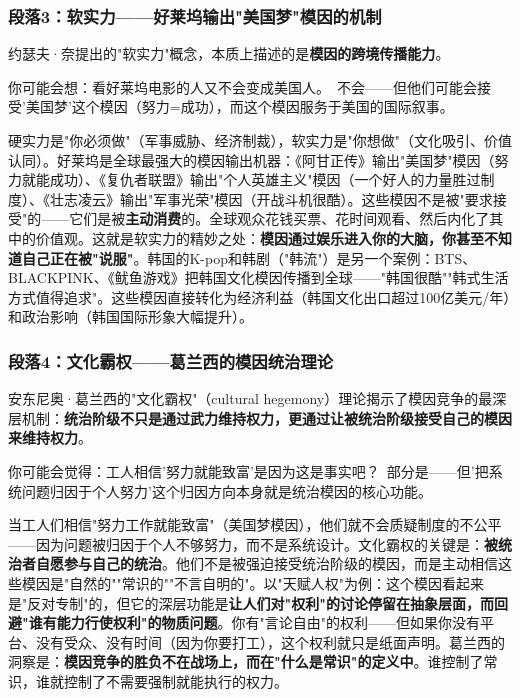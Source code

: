\documentclass[../main.tex]{subfiles}
\begin{document}
	\subsubsection*{段落3：软实力——好莱坞输出"美国梦"模因的机制}

	约瑟夫·奈提出的"软实力"概念，本质上描述的是\textbf{模因的跨境传播能力}。

	\begin{tcolorbox}[colback=yellow!5, title=\textit{读者行为预测}]

		你可能会想：看好莱坞电影的人又不会变成美国人。\ 不会——但他们可能会接受'美国梦'这个模因（努力=成功），而这个模因服务于美国的国际叙事。

	\end{tcolorbox}

硬实力是"你必须做"（军事威胁、经济制裁），软实力是"你想做"（文化吸引、价值认同）。好莱坞是全球最强大的模因输出机器：《阿甘正传》输出"美国梦"模因（努力就能成功）、《复仇者联盟》输出"个人英雄主义"模因（一个好人的力量胜过制度）、《壮志凌云》输出"军事光荣"模因（开战斗机很酷）。这些模因不是被"要求接受"的——它们是被\textbf{主动消费}的。全球观众花钱买票、花时间观看、然后内化了其中的价值观。这就是软实力的精妙之处：\textbf{模因通过娱乐进入你的大脑，你甚至不知道自己正在被"说服"}。韩国的K-pop和韩剧（"韩流"）是另一个案例：BTS、BLACKPINK、《鱿鱼游戏》把韩国文化模因传播到全球——"韩国很酷""韩式生活方式值得追求"。这些模因直接转化为经济利益（韩国文化出口超过100亿美元/年）和政治影响（韩国国际形象大幅提升）。

	\subsubsection*{段落4：文化霸权——葛兰西的模因统治理论}

	安东尼奥·葛兰西的"文化霸权"（cultural hegemony）理论揭示了模因竞争的最深层机制：\textbf{统治阶级不只是通过武力维持权力，更通过让被统治阶级接受自己的模因来维持权力}。

	\begin{tcolorbox}[colback=yellow!5, title=\textit{读者行为预测}]

		你可能会觉得：工人相信'努力就能致富'是因为这是事实吧？\ 部分是——但'把系统问题归因于个人努力'这个归因方向本身就是统治模因的核心功能。

	\end{tcolorbox}

当工人们相信"努力工作就能致富"（美国梦模因），他们就不会质疑制度的不公平——因为问题被归因于个人不够努力，而不是系统设计。文化霸权的关键是：\textbf{被统治者自愿参与自己的统治}。他们不是被强迫接受统治阶级的模因，而是主动相信这些模因是"自然的""常识的""不言自明的"。以"天赋人权"为例：这个模因看起来是"反对专制"的，但它的深层功能是\textbf{让人们对"权利"的讨论停留在抽象层面，而回避"谁有能力行使权利"的物质问题}。你有"言论自由"的权利——但如果你没有平台、没有受众、没有时间（因为你要打工），这个权利就只是纸面声明。葛兰西的洞察是：\textbf{模因竞争的胜负不在战场上，而在"什么是常识"的定义中}。谁控制了常识，谁就控制了不需要强制就能执行的权力。
\end{document}

